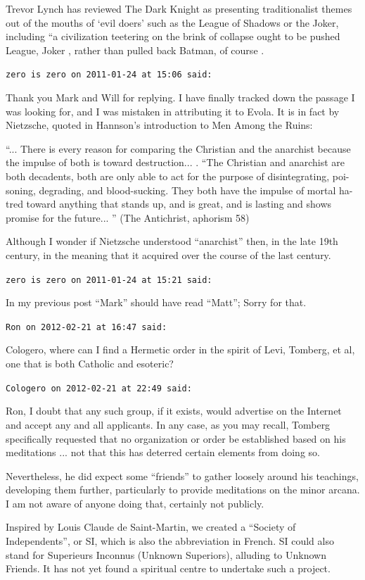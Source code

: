 \begin{footnotesize}
\begin{sffamily}
Trevor Lynch has reviewed The Dark Knight as presenting traditionalist themes out of the mouths of `evil doers' such as the League of Shadows or the Joker, including ``a civilization teetering on the brink of collapse ought to be pushed League, Joker , rather than pulled back Batman, of course .

\hfill

\texttt{zero is zero on 2011-01-24 at 15:06 said:}

Thank you Mark and Will for replying. I have finally tracked down the passage I was looking for, and I was mistaken in attributing it to Evola. It is in fact by Nietzsche, quoted in Hannson's introduction to Men Among the Ruins:

``... There is every reason for comparing the Christian and the anarchist because the impulse of both is toward destruction... . ``The Christian and anarchist are both decadents, both are only able to act for the purpose of disintegrating, poi-soning, degrading, and blood-sucking. They both have the impulse of mortal ha-tred toward anything that stands up, and is great, and is lasting and shows promise for the future... '' (The Antichrist, aphorism 58)

Although I wonder if Nietzsche understood ``anarchist'' then, in the late 19th century, in the meaning that it acquired over the course of the last century.

\hfill

\texttt{zero is zero on 2011-01-24 at 15:21 said:}

In my previous post ``Mark'' should have read ``Matt''; Sorry for that.

\hfill

\texttt{Ron on 2012-02-21 at 16:47 said:}

Cologero, where can I find a Hermetic order in the spirit of Levi, Tomberg, et al, one that is both Catholic and esoteric?

\hfill

\texttt{Cologero on 2012-02-21 at 22:49 said:}

Ron, I doubt that any such group, if it exists, would advertise on the Internet and accept any and all applicants. In any case, as you may recall, Tomberg specifically requested that no organization or order be established based on his meditations ... not that this has deterred certain elements from doing so.

Nevertheless, he did expect some ``friends'' to gather loosely around his teachings, developing them further, particularly to provide meditations on the minor arcana. I am not aware of anyone doing that, certainly not publicly.

Inspired by Louis Claude de Saint-Martin, we created a ``Society of Independents'', or SI, which is also the abbreviation in French. SI could also stand for Superieurs Inconnus (Unknown Superiors), alluding to Unknown Friends. It has not yet found a spiritual centre to undertake such a project.


\hfill

\end{sffamily}
\end{footnotesize}


